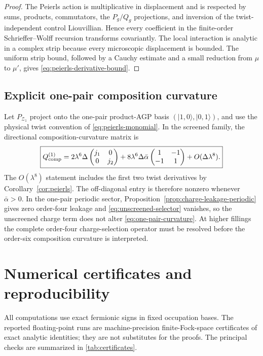 \documentclass[11pt]{article}
\theoremstyle{definition}
\theoremstyle{remark}
\newcommand{\cZ}{\mathcal Z}
\newcommand{\ket}[1]{\lvert #1\rangle}
\begin{document}
\begin{proof}
The Peierls action is multiplicative in displacement and is respected by sums, products, commutators, the $P_g/Q_g$ projections, and inversion of the twist-independent control Liouvillian.  Hence every coefficient in the finite-order Schrieffer--Wolff recursion transforms covariantly.  The local interaction is analytic in a complex strip because every microscopic displacement is bounded.  The uniform strip bound, followed by a Cauchy estimate and a small reduction from $\mu$ to $\mu'$, gives \eqref{eq:peierls-derivative-bound}.
\end{proof}

\subsection{Explicit one-pair composition curvature}

Let $P_{\cZ_1}$ project onto the one-pair product-AGP basis $(\ket{1,0},\ket{0,1})$, and use the physical twist convention of \eqref{eq:peierls-monomial}.  In the screened family, the directional composition-curvature matrix is
\begin{equation}
\boxed{
 Q_{\rm comp}^{(1)}
 =2\lambda^6\Delta
 \begin{pmatrix}j_1&0\\0&j_2\end{pmatrix}
 +8\lambda^6\Delta\bar\alpha
 \begin{pmatrix}1&-1\\-1&1\end{pmatrix}
 +O(\Delta\lambda^8).
}
\label{eq:one-pair-curvature}
\end{equation}
The $O(\lambda^8)$ statement includes the first two twist derivatives by Corollary~\ref{cor:peierls}.  The off-diagonal entry is therefore nonzero whenever $\bar\alpha>0$.  In the one-pair periodic sector, Proposition~\ref{prop:charge-leakage-periodic} gives zero order-four leakage and \eqref{eq:unscreened-selector} vanishes, so the unscreened charge term does not alter \eqref{eq:one-pair-curvature}.  At higher fillings the complete order-four charge-selection operator must be resolved before the order-six composition curvature is interpreted.

\section{Numerical certificates and reproducibility}
\label{sec:numerics}

All computations use exact fermionic signs in fixed occupation bases.  The reported floating-point runs are machine-precision finite-Fock-space certificates of exact analytic identities; they are not substitutes for the proofs.  The principal checks are summarized in \cref{tab:certificates}.
\end{document}
